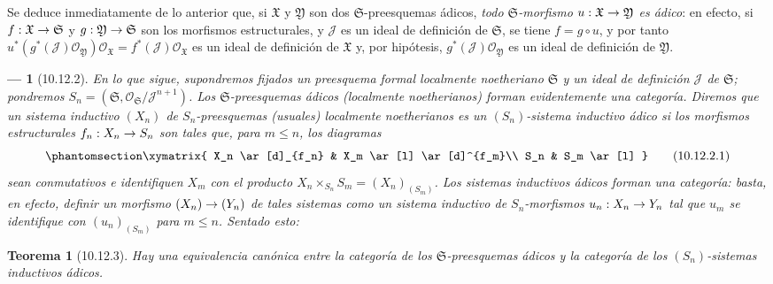 \documentclass[oneside]{amsart}
\theoremstyle{ega-env-style}
\newtheorem*{env}{---}
\theoremstyle{ega-thm-env-style}
\newtheorem*{theorem}{Teorema}
\theoremstyle{ega-defn-env-style}
\def\leq{\leqslant}                 %
\renewcommand{\to}{\mathchoice{\longrightarrow}{\rightarrow}{\rightarrow}{\rightarrow}}
\let\EGAOriginalLabel\label
\renewcommand{\label}[1]{\phantomsection\EGAOriginalLabel{#1}}
\begin{document}
Se deduce inmediatamente de lo anterior que, si $\mathfrak{X}$ y $\mathfrak{Y}$ son dos $\mathfrak{S}$-preesquemas ádicos, \emph{todo $\mathfrak{S}$-morfismo $u:\mathfrak{X}\to\mathfrak{Y}$ es ádico}:
en efecto, si $f:\mathfrak{X}\to\mathfrak{S}$ y $g:\mathfrak{Y}\to\mathfrak{S}$ son los morfismos estructurales, y $\mathscr{J}$ es un ideal de definición de $\mathfrak{S}$, se tiene $f=g\circ u$, y por tanto $u^*(g^*(\mathscr{J})\mathscr{O}_{\mathfrak{Y}})
\mathscr{O}_{\mathfrak{X}}=f^*(\mathscr{J})
\mathscr{O}_{\mathfrak{X}}$ es un ideal de definición de $\mathfrak{X}$ y, por hipótesis, $g^*(\mathscr{J})\mathscr{O}_{\mathfrak{Y}}$ es un ideal de definición de $\mathfrak{Y}$.

\begin{env}[10.12.2]
\label{I.10.12.2}
En lo que sigue, supondremos fijados un preesquema formal localmente noetheriano $\mathfrak{S}$ y un ideal de definición $\mathscr{J}$ de $\mathfrak{S}$;
pondremos $S_n=(\mathfrak{S},\mathscr{O}_{\mathfrak{S}}/\mathscr{J}^{n+1})$.
Los $\mathfrak{S}$-preesquemas ádicos (localmente noetherianos) forman evidentemente una \emph{categoría}.
Diremos que un sistema inductivo $(X_n)$ de $S_n$-preesquemas (usuales) localmente noetherianos es un \emph{$(S_n)$-sistema inductivo ádico} si los morfismos estructurales $f_n:X_n\to S_n$ son tales que, para $m\leq n$, los diagramas
\[
  \label{I.10.12.2.1-fr}
  \xymatrix{
    X_n \ar[d]_{f_n}
    & X_m \ar[l] \ar[d]^{f_m}\\
    S_n
    & S_m \ar[l]
  }
  \tag{10.12.2.1}
\]
sean conmutativos e \emph{identifiquen $X_m$ con el producto $X_n\times_{S_n}S_m=(X_n)_{(S_m)}$}.
Los sistemas inductivos ádicos forman una \emph{categoría}:
basta, en efecto, definir un morfismo $(X_n)\to(Y_n)$ de tales sistemas como un \emph{sistema inductivo de $S_n$-morfismos $u_n:X_n\to Y_n$} tal que $u_m$ se identifique con $(u_n)_{(S_m)}$ para $m\leq n$.
Sentado esto:
\end{env}

\begin{theorem}[10.12.3]
\label{I.10.12.3}
Hay una equivalencia canónica entre la categoría de los $\mathfrak{S}$-preesquemas ádicos y la categoría de los $(S_n)$-sistemas inductivos ádicos.
\end{theorem}
\end{document}
